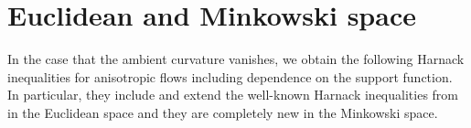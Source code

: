 \section{Euclidean and Minkowski space}
In the case that the ambient curvature vanishes, we obtain the following Harnack inequalities for anisotropic flows including dependence on the support function. In particular, they include  and extend the well-known Harnack inequalities from \cite{Andrews:09/1994} in the Euclidean space and they are completely new in the Minkowski space.
